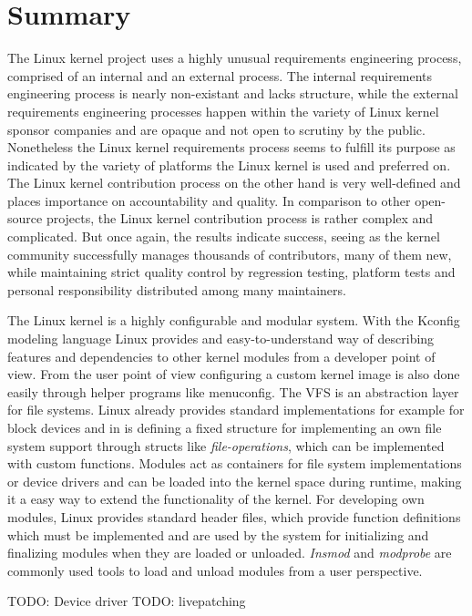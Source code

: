 \documentclass{sig-alternate-05-2015}
\begin{document}
\section{Summary}
The Linux kernel project uses a highly unusual requirements engineering process, comprised of an internal and an external process.
The internal requirements engineering process is nearly non-existant and lacks structure, while the external requirements engineering processes happen within the variety of Linux kernel sponsor companies and are opaque and not open to scrutiny by the public.
Nonetheless the Linux kernel requirements process seems to fulfill its purpose as indicated by the variety of platforms the Linux kernel is used and preferred on.
The Linux kernel contribution process on the other hand is very well-defined and places importance on accountability and quality.
In comparison to other open-source projects, the Linux kernel contribution process is rather complex and complicated.
But once again, the results indicate success, seeing as the kernel community successfully manages thousands of contributors, many of them new, while maintaining strict quality control by regression testing, platform tests and personal responsibility distributed among many maintainers.

The Linux kernel is a highly configurable and modular system. With the Kconfig modeling language Linux provides and easy-to-understand way of describing features and dependencies to other kernel modules from a developer point of view. From the user point of view configuring a custom kernel image is also done easily through helper programs like menuconfig. The VFS is an abstraction layer for file systems. Linux already provides standard implementations  for example for block devices and in is defining a fixed structure for implementing an own file system support through structs like \emph{file-operations}, which can be implemented with custom functions. Modules act as containers for file system implementations or device drivers and can be loaded into the kernel space during runtime, making it a easy way to extend the functionality of the kernel. For developing own modules, Linux provides standard header files, which provide function definitions which must be implemented and are used by the system for initializing and finalizing modules when they are loaded or unloaded. \emph{Insmod} and \emph{modprobe} are commonly used tools to load and unload modules from a user perspective.

TODO: Device driver
TODO: livepatching





\balancecolumns{}
\end{document}
